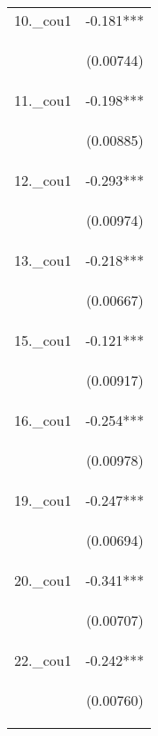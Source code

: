 \documentclass[]{article}
\begin{document}
\begin{center}
\begin{tabular}{lc}
10.\_cou1 & -0.181*** \\
\vspace{4pt} & \begin{footnotesize}(0.00744)\end{footnotesize} \\
11.\_cou1 & -0.198*** \\
\vspace{4pt} & \begin{footnotesize}(0.00885)\end{footnotesize} \\
12.\_cou1 & -0.293*** \\
\vspace{4pt} & \begin{footnotesize}(0.00974)\end{footnotesize} \\
13.\_cou1 & -0.218*** \\
\vspace{4pt} & \begin{footnotesize}(0.00667)\end{footnotesize} \\
15.\_cou1 & -0.121*** \\
\vspace{4pt} & \begin{footnotesize}(0.00917)\end{footnotesize} \\
16.\_cou1 & -0.254*** \\
\vspace{4pt} & \begin{footnotesize}(0.00978)\end{footnotesize} \\
19.\_cou1 & -0.247*** \\
\vspace{4pt} & \begin{footnotesize}(0.00694)\end{footnotesize} \\
20.\_cou1 & -0.341*** \\
\vspace{4pt} & \begin{footnotesize}(0.00707)\end{footnotesize} \\
22.\_cou1 & -0.242*** \\
\vspace{4pt} & \begin{footnotesize}(0.00760)\end{footnotesize} \\

\end{tabular}
\end{center}
\end{document}
